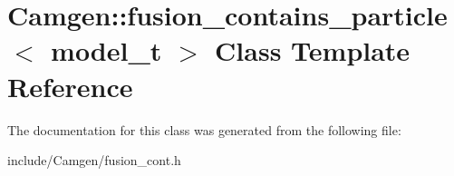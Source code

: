 \hypertarget{a00239}{}\section{Camgen\+:\+:fusion\+\_\+contains\+\_\+particle$<$ model\+\_\+t $>$ Class Template Reference}
\label{a00239}


The documentation for this class was generated from the following file\+:\begin{DoxyCompactItemize}
\item 
include/\+Camgen/fusion\+\_\+cont.\+h\end{DoxyCompactItemize}
